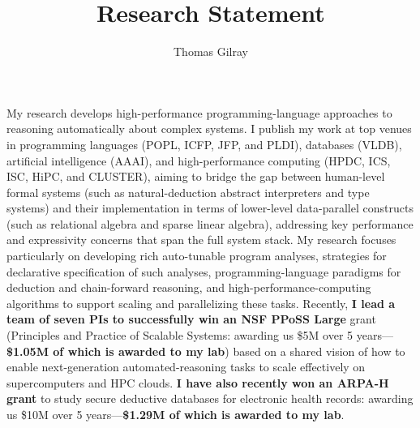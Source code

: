 \documentclass[12pt]{article}
\begin{document}
\title{Research Statement\vspace{-0.25cm}}
\author{Thomas Gilray}
\date{}
\maketitle
\vspace{-1.45cm}


My research develops high-performance programming-language approaches to reasoning automatically about complex systems. I publish my work at top venues in programming languages (POPL, ICFP, JFP, and PLDI), databases (VLDB), artificial intelligence (AAAI), and high-performance computing (HPDC, ICS, ISC, HiPC, and CLUSTER), aiming to bridge the gap between human-level formal systems (such as natural-deduction abstract interpreters and type systems) and their implementation in terms of lower-level data-parallel constructs (such as relational algebra and sparse linear algebra), addressing key performance and expressivity concerns that span the full system stack. My research focuses particularly on developing rich auto-tunable program analyses, strategies for declarative specification of such analyses, programming-language paradigms for deduction and chain-forward reasoning, and high-performance-computing algorithms to support scaling and parallelizing these tasks.
Recently, \textbf{I lead a team of seven PIs to successfully win an NSF PPoSS Large} grant (Principles and Practice of Scalable Systems: awarding us \$5M over 5 years---\textbf{\$1.05M of which is awarded to my lab}) based on a shared vision of how to enable next-generation automated-reasoning tasks to scale effectively on supercomputers and HPC clouds. \textbf{I have also recently won an ARPA-H grant} to study secure deductive databases for electronic health records: awarding us \$10M over 5 years---\textbf{\$1.29M of which is awarded to my lab}. 

\end{document}

